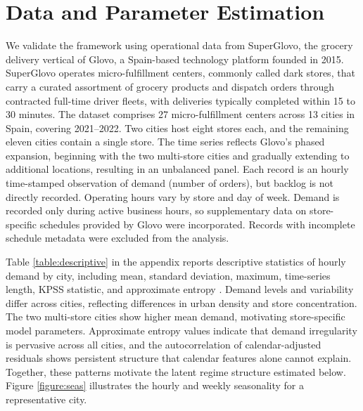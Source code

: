 \documentclass[preprint,11pt,authoryear]{elsarticle}
\theoremstyle{remark}
\begin{document}
\section{Data and Parameter Estimation}
\label{sec:demand_estimation}


We validate the framework using operational data from SuperGlovo, the grocery delivery vertical of Glovo, a Spain-based technology platform founded in 2015. SuperGlovo operates micro-fulfillment centers, commonly called dark stores, that carry a curated assortment of grocery products and dispatch orders through contracted full-time driver fleets, with deliveries typically completed within 15 to 30 minutes. The dataset comprises 27 micro-fulfillment centers across 13 cities in Spain, covering 2021--2022. Two cities host eight stores each, and the remaining eleven cities contain a single store. The time series reflects Glovo's phased expansion, beginning with the two multi-store cities and gradually extending to additional locations, resulting in an unbalanced panel. Each record is an hourly time-stamped observation of demand (number of orders), but backlog is not directly recorded. Operating hours vary by store and day of week. Demand is recorded only during active business hours, so supplementary data on store-specific schedules provided by Glovo were incorporated. Records with incomplete schedule metadata were excluded from the analysis.

Table \ref{table:descriptive} in the appendix reports descriptive statistics of hourly demand by city, including mean, standard deviation, maximum, time-series length, KPSS statistic, and approximate entropy \citep{olbrys2022approximate}. Demand levels and variability differ across cities, reflecting differences in urban density and store concentration. The two multi-store cities show higher mean demand, motivating store-specific model parameters. Approximate entropy values indicate that demand irregularity is pervasive across all cities, and the autocorrelation of calendar-adjusted residuals shows persistent structure that calendar features alone cannot explain. Together, these patterns motivate the latent regime structure estimated below. Figure \ref{figure:seas} illustrates the hourly and weekly seasonality for a representative city.
\end{document}
